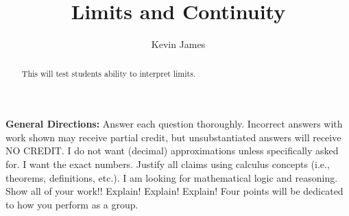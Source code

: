 \documentclass[handout,nooutcomes,noauthor]{Ximera}
\author{Kevin James}
\title{Limits and Continuity}
\begin{document}
	\begin{abstract}
		This will test students ability to interpret limits.
	\end{abstract}

	\maketitle
	
	\textbf{General Directions:}  Answer each question thoroughly.  Incorrect answers with work shown may receive partial credit, but unsubstantiated answers will receive NO CREDIT.  I do not want (decimal) approximations unless specifically asked for.  I want the exact numbers.  Justify all claims using calculus concepts (i.e., theorems, definitions, etc.).  I am looking for mathematical logic and reasoning.  Show all of your work!! Explain!  Explain!  Explain!  Four points will be dedicated to how you perform as a group.
	\vspace{5mm}
	
\end{document}
